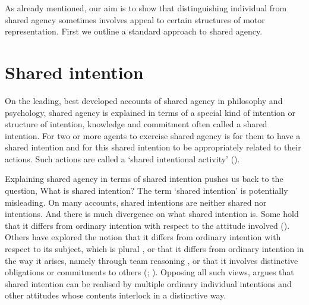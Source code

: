 \documentclass[12pt,\papersize]{extarticle}
\begin{document}
%
%

As already mentioned, our aim is to show that distinguishing individual from shared agency sometimes involves appeal to certain structures of motor representation.
First we outline a standard approach to shared agency. 


\section{Shared intention}
On the leading, best developed accounts of shared agency in philosophy and psychology, 
shared agency is explained  in terms of a special kind of intention or structure of intention, knowledge and commitment often called a shared intention.
For two or more agents to exercise shared agency is for them to have a shared intention and for this shared intention to be appropriately related to their actions.
Such actions are called a `shared intentional activity' (\citealp[p.\ 142]{Bratman:1999fr}).%

Explaining shared agency in terms of shared intention pushes us back to the question, What is shared intention?
The term `shared intention' is potentially misleading.
On many accounts, shared intentions are neither shared nor intentions.
And there is much divergence on what shared intention is.
Some hold that it differs from
ordinary intention with respect to the attitude involved (\citealp{Searle:1990em}). 
Others have explored the notion that it differs from ordinary intention with respect to its subject, which is plural \citep{Gilbert:1992rs,helm_plural_2008}, 
or that it differs from ordinary intention in the way it arises, namely through team reasoning \citep{Gold:2007zd}, 
or that it involves distinctive obligations or commitments to others (\citealp{Gilbert:1992rs}; \citealp{Roth:2004ki}).
Opposing all such views, \citet{Bratman:1992mi,Bratman:2009lv} argues that shared intention can be realised by multiple ordinary individual intentions and other attitudes whose contents interlock in a distinctive way. 
\end{document}
